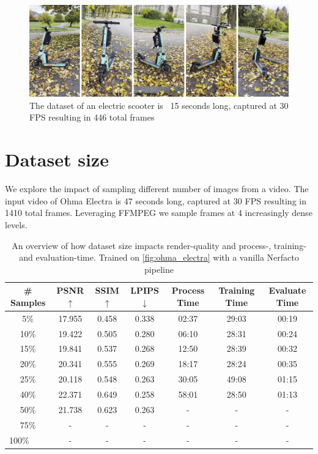 \begin{figure}[h]
    \centering
    \includegraphics[width=1.0\textwidth]{figures/tier.png}
    \caption{The dataset of an electric scooter is ~15 seconds long, captured at 30 FPS resulting in 446 total frames}
    \label{fig:tier}
\end{figure}

\section{Dataset size}

We explore the impact of sampling different number of images from a video. The input video of Ohma Electra \cite{data:object-unbounded-ohma} is 47 seconds long, captured at 30 FPS resulting in 1410 total frames. Leveraging FFMPEG we sample frames at 4 increasingly dense levels.

\begin{table}[h]
\begin{tabular}{ccccccc}
\hline
\# Samples & PSNR $\uparrow$ & SSIM $\uparrow$ & LPIPS $\downarrow$ & Process Time & Training Time & Evaluate Time \\ \hline
5\%                       & 17.955    & 0.458     & 0.338    & 02:37    & 29:03    & 00:19    \\
10\%                      & 19.422    & 0.505     & 0.280    & 06:10    & 28:31    & 00:24    \\
15\%                      & 19.841    & 0.537     & 0.268    & 12:50    & 28:39    & 00:32    \\
20\%                      & 20.341    & 0.555     & 0.269    & 18:17    & 28:24    & 00:35    \\
25\%                      & 20.118    & 0.548     & 0.263    & 30:05    & 49:08    & 01:15    \\
40\%                      & 22.371    & 0.649     & 0.258    & 58:01    & 28:50    & 01:13    \\
50\%                      & 21.738    & 0.623     & 0.263    & -    & -    & -    \\
75\%                      & -    & -     & -    & -    & -    & -    \\
\multicolumn{1}{l}{100\%} & -    & -     & -    & -    & -    & -    \\ \hline
\end{tabular}
\caption{An overview of how dataset size impacts render-quality and process-, training- and evaluation-time. Trained on \autoref{fig:ohma_electra} with a vanilla Nerfacto pipeline}
\end{table}

